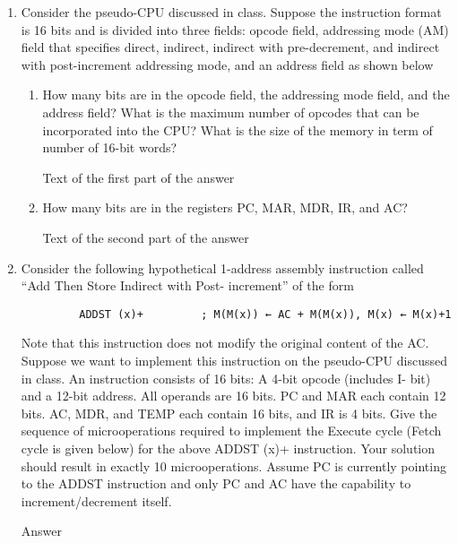 \documentclass[12pt,letterpaper]{article}
\begin{document}
\begin{enumerate}
    \item
    Consider the pseudo-CPU discussed in class. Suppose the instruction format is 16 bits and is
    divided into three fields: opcode field, addressing mode (AM) field that specifies direct,
    indirect, indirect with pre-decrement, and indirect with post-increment addressing mode, and an
    address field as shown below

    \begin{enumerate}
        \item
        How many bits are in the opcode field, the addressing mode field, and
        the address field? What is the maximum number of opcodes that can be
        incorporated into the CPU? What is the size of the memory in term of number of
        16-bit words?

        Text of the first part of the answer

        \item
        How many bits are in the registers PC, MAR, MDR, IR, and AC?

        Text of the second part of the answer
    \end{enumerate}


    \item
    Consider the following hypothetical 1-address assembly instruction called “Add
    Then Store Indirect with Post- increment” of the form
    \begin{verbatim}
         ADDST (x)+         ; M(M(x)) ← AC + M(M(x)), M(x) ← M(x)+1
    \end{verbatim}
    Note that this instruction does not modify the original content of the AC.
    Suppose we want to implement this instruction on the pseudo-CPU discussed in
    class. An instruction consists of 16 bits: A 4-bit opcode (includes I- bit) and
    a 12-bit address. All operands are 16 bits. PC and MAR each contain 12 bits.
    AC, MDR, and TEMP each contain 16 bits, and IR is 4 bits. Give the sequence of
    microoperations required to implement the Execute cycle (Fetch cycle is given
    below) for the above ADDST (x)+ instruction. Your solution should result in
    exactly 10 microoperations. Assume PC is currently pointing to the ADDST
    instruction and only PC and AC have the capability to increment/decrement
    itself.
    
    Answer


\end{enumerate}
\end{document}
